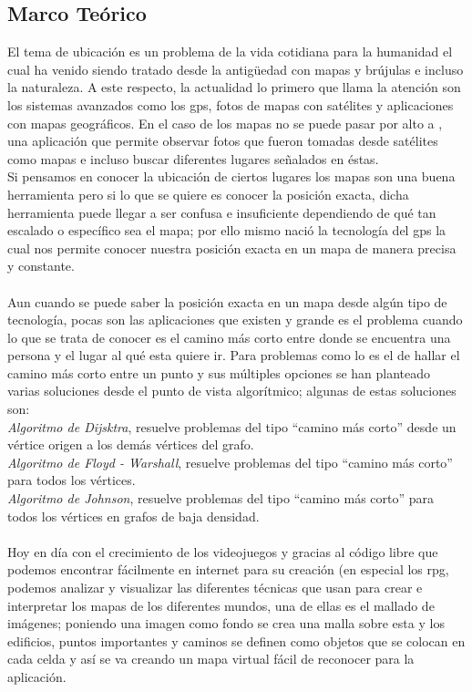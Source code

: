 \documentclass[11pt]{book}
\begin{document}
\subsection{Marco Teórico}
El tema de ubicación es un problema de la vida cotidiana para la humanidad el cual ha venido siendo tratado desde la antigüedad con mapas y brújulas e incluso la naturaleza. A este respecto, la actualidad lo primero que llama la atención son los sistemas avanzados como los \gls{gps}, fotos de mapas con satélites y aplicaciones con mapas geográficos. En el caso de los mapas no se puede pasar por alto a \cite{gearth}, una aplicación que permite observar fotos que fueron tomadas desde satélites como mapas e incluso buscar diferentes lugares señalados en éstas.\\
Si pensamos en conocer la ubicación de ciertos lugares los mapas son una buena herramienta pero si lo que se quiere es conocer la posición exacta, dicha herramienta puede llegar a ser confusa e insuficiente dependiendo de qué tan escalado o específico sea el mapa; por ello mismo nació la tecnología del \gls{gps} la cual nos permite conocer nuestra posición exacta en un mapa de manera precisa y constante.\\\\
Aun cuando se puede saber la posición exacta en un mapa desde algún tipo de tecnología, pocas son las aplicaciones que existen y grande es el problema cuando lo que se trata de conocer es el camino más corto entre donde se encuentra una persona y el lugar al qué esta quiere ir. Para problemas como lo es el de hallar el camino más corto entre un punto y sus múltiples opciones se han planteado varias soluciones desde el punto de vista algorítmico; algunas de estas soluciones son:\\
\emph{Algoritmo de Dijsktra}, resuelve problemas del tipo “camino más corto” desde un vértice origen a los demás vértices del grafo.\\
\emph{Algoritmo de Floyd - Warshall}, resuelve problemas del tipo “camino más corto” para todos los vértices.\\
\emph{Algoritmo de Johnson}, resuelve problemas del tipo “camino más corto” para todos los vértices en grafos de baja densidad.\\\\
Hoy en día con el crecimiento de los videojuegos y gracias al código libre que podemos encontrar fácilmente en internet para su creación (en especial los \gls{rpg}, podemos analizar y visualizar las diferentes técnicas que usan para crear e interpretar los mapas de los diferentes mundos, una de ellas es el mallado de imágenes; poniendo una imagen como fondo se crea una malla sobre esta y los edificios, puntos importantes y caminos se definen como objetos que se colocan en cada celda y así se va creando un mapa virtual fácil de reconocer para la aplicación.
\end{document}
